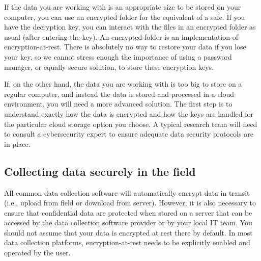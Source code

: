 If the data you are working with is an appropriate size to be stored on your computer,
you can use an encrypted folder for the equivalent of a safe.
If you have the decryption key, you can interact with the files in an encrypted folder as usual (after entering the key).
An encrypted folder is an implementation of encryption-at-rest.
There is absolutely no way to restore your data if you lose your key,
so we cannot stress enough the importance of using a password manager,
or equally secure solution, to store these encryption keys.

If, on the other hand, the data you are working with is too big to store on a regular computer,
and instead the data is stored and processed in a cloud environment,
you will need a more advanced solution. 
The first step is to understand exactly how the data is encrypted
and how the keys are handled for the particular cloud storage option you choose.
A typical research team
will need to consult a cybersecurity expert to ensure adequate data security protocols are in place.

\subsection{Collecting data securely in the field}

All common data collection software will automatically encrypt
data in transit (i.e., upload from field or download from server).
However, it is also necessary to ensure that confidential data
are protected when stored on a server that can be accessed
by the data collection software provider or by your local IT team.
You should not assume that your data is encrypted at rest there by default.
In most data collection platforms,
encryption-at-rest needs to be explicitly enabled and operated by the user.

